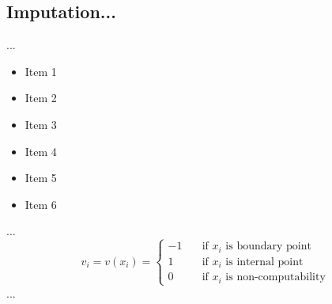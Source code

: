 \documentclass[runningheads]{llncs}
\begin{document}
\subsection{Imputation... }
...
\begin{itemize}
  \item Item 1
  \item Item 2
  \item Item 3
  \item Item 4
  \item Item 5
  \item Item 6
\end{itemize}
...
\begin{equation}
v_i=v(x_i)=
  \begin{cases}
    -1 & {\quad \text{if } x_i \text{ is boundary point}}\\
    1  & {\quad \text{if } x_i \text{ is internal point}}\\
    0  & {\quad \text{if } x_i \text{ is non-computability}}
  \end{cases}
\end{equation}
...
\end{document}
